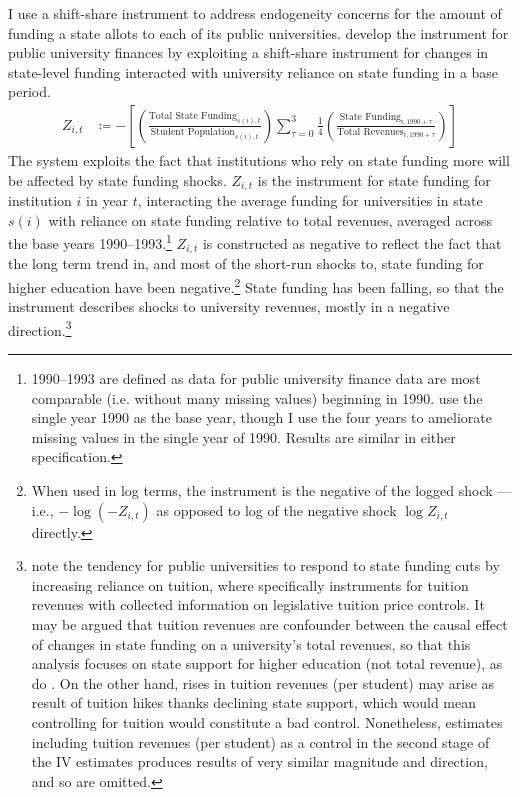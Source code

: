 I use a shift-share instrument to address endogeneity concerns for the amount of funding a state allots to each of its public universities.
\cite{NBERw23736,NBERw27885} develop the instrument for public university finances by exploiting a shift-share instrument for changes in state-level funding interacted with university reliance on state funding in a base period.
\begin{align}
    \label{eqn:public-instrument}
    Z_{i,t} &\coloneqq - \left[
    \left( \frac{\text{Total State Funding}_{s(i),t}}{\text{Student Population}_{s(i),t}} \right)
    \sum_{\tau = 0}^{3} \frac 14
    \left( \frac{\text{State Funding}_{i,1990 + \tau}}{\text{Total Revenues}_{i,1990 + \tau}} \right) \right]
\end{align}
The system exploits the fact that institutions who rely on state funding more will be affected by state funding shocks.
$Z_{i,t}$ is the instrument for state funding for institution $i$ in year $t$, interacting the average funding for universities in state $s(i)$ with reliance on state funding relative to total revenues, averaged across the base years 1990--1993.\footnote{
    1990--1993 are defined as data for public university finance data are most comparable (i.e. without many missing values) beginning in 1990.
    \cite{NBERw23736} use the single year 1990 as the base year, though I use the four years to ameliorate missing values in the single year of 1990.
    Results are similar in either specification.
}
$Z_{i,t}$ is constructed as negative to reflect the fact that the long term trend in, and most of the short-run shocks to, state funding for higher education have been negative.\footnote{
    When used in log terms, the instrument is the negative of the logged shock --- i.e., $- \log \left( -Z_{i,t} \right)$ as opposed to log of the negative shock $\log Z_{i,t}$ directly.
}
State funding has been falling, so that the instrument describes shocks to university revenues, mostly in a negative direction.\footnote{
    \label{foot:control}
    \cite{NBERw27885} note the tendency for public universities to respond to state funding cuts by increasing reliance on tuition, where \cite{NBERw23736} specifically instruments for tuition revenues with collected information on legislative tuition price controls.
    It may be argued that tuition revenues are confounder between the causal effect of changes in state funding on a university's total revenues, so that this analysis focuses on state support for higher education (not total revenue), as do \cite{NBERw27885}.
    On the other hand, rises in tuition revenues (per student) may arise as result of tuition hikes thanks declining state support, which would mean controlling for tuition would constitute a bad control.
    Nonetheless, estimates including tuition revenues (per student) as a control in the second stage of the IV estimates produces results of very similar magnitude and direction, and so are omitted.
}
